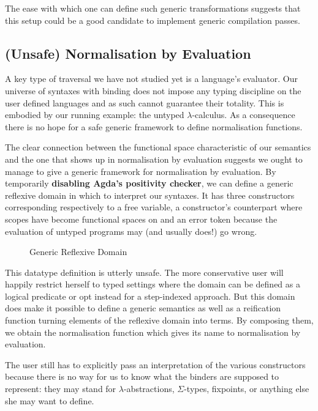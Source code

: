 The ease with which one can define such generic transformations
suggests that this setup could be a good candidate to implement
generic compilation passes.

\subsection{(Unsafe) Normalisation by Evaluation}

A key type of traversal we have not studied yet is a language's
evaluator. Our universe of syntaxes with binding does not impose
any typing discipline on the user defined languages and as such
cannot guarantee their totality. This is embodied by our running
example: the untyped $\lambda$-calculus. As a consequence there
is no hope for a safe generic framework to define normalisation
functions.

The clear connection between the  functional space
characteristic of our semantics and the one that shows up in
normalisation by evaluation suggests we ought to manage to
give a generic framework for normalisation by evaluation.
By temporarily \textbf{disabling Agda's positivity checker},
we can define a generic reflexive domain  in which to
interpret our syntaxes. It has three constructors corresponding
respectively to a free variable, a constructor's counterpart where
scopes have become  functional spaces on  and
an error token because the evaluation of untyped programs may
(and usually does!) go wrong.

\begin{figure}[h]
{\center {}}
\caption{Generic Reflexive Domain}
\end{figure}

This datatype definition is utterly unsafe. The more conservative
user will happily restrict herself to typed settings where the
domain can be defined as a logical predicate or opt instead for
a step-indexed approach. But this domain does make it possible
to define a generic  semantics as well as a reification
function turning elements of the reflexive domain into terms.
By composing them, we obtain the normalisation function which
gives its name to normalisation by evaluation.

The user still has to explicitly pass an interpretation of
the various constructors because there is no way for us to
know what the binders are supposed to represent: they may
stand for $\lambda$-abstractions, $\Sigma$-types, fixpoints, or
anything else she may want to define.


